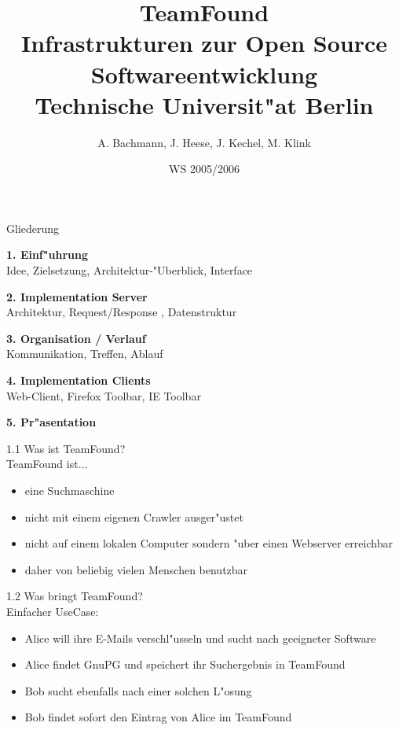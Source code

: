 \documentclass[landscape]{slides}
\begin{document}
%
\title{TeamFound\\Infrastrukturen zur Open Source Softwareentwicklung\\Technische Universit"at Berlin}
\author{A. Bachmann, J. Heese, J. Kechel, M. Klink}
\date{WS 2005/2006}

%
\maketitle%
%
\begin{slide}{Gliederung}

\textbf{1. Einf"uhrung}\\
Idee, Zielsetzung, Architektur-"Uberblick, Interface

\textbf{2. Implementation Server}\\
Architektur, Request/Response , Datenstruktur 

\textbf{3. Organisation / Verlauf}\\
Kommunikation, Treffen, Ablauf

\textbf{4. Implementation Clients}\\
Web-Client, Firefox Toolbar, IE Toolbar

\textbf{5. Pr"asentation}
\end{slide}
%
%
%
%
\begin{slide}{1.1 Was ist TeamFound?}\\

TeamFound ist...

\begin{itemize}
\item eine Suchmaschine
\item nicht mit einem eigenen Crawler ausger"ustet
\item nicht auf einem lokalen Computer sondern "uber einen Webserver erreichbar
\item daher von beliebig vielen Menschen benutzbar
\end{itemize}

\end{slide}
%
\begin{slide}{1.2 Was bringt TeamFound?}\\

Einfacher UseCase:

\begin{itemize}
\item Alice will ihre E-Mails verschl"usseln und sucht nach geeigneter Software
\item Alice findet GnuPG und speichert ihr Suchergebnis in TeamFound
\item Bob sucht ebenfalls nach einer solchen L"osung
\item Bob findet sofort den Eintrag von Alice im TeamFound
\end{itemize}
\end{slide}
\end{document}
